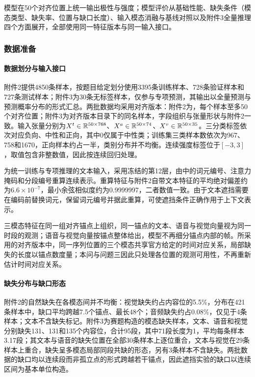 模型在50个对齐位置上统一输出极性与强度；模型评价从基础性能、缺失条件（模态类型、缺失率、位置与缺口长度）、输入模态消融与基线对照以及附件3全量推理四个方面展开，全部使用同一特征版本与同一输入接口。

\subsubsection{数据准备}
\paragraph{数据划分与输入接口}
附件2提供4850条样本，按题目给定划分使用3395条训练样本、728条验证样本和727条测试样本；附件3为30条无标签样本，仅参与专项预测，其输出以全量预测与预测概率分布的形式汇总。两批数据均采用对齐版本：附件2为，每个样本至多50个对齐位置；附件3为对齐版本目录下的同名样本，字段组织与张量形状与附件2一致。输入张量分别为$X^t\in\mathbb R^{50\times768}$、$X^a\in\mathbb R^{50\times74}$、$X^v\in\mathbb R^{50\times35}$。三分类标签依次对应负向、中性和正向，其中0仅属于中性类；训练集三类样本数依次为967、758和1670，正向样本约占一半，类别分布并不均衡。连续强度标签位于$[-3,3]$，取值包含非整数值，因此按连续回归处理。

为统一训练与专项推理的文本输入，采用冻结的第12层，由中的词元编号、注意力掩码和分段编号重算连续表示。重算特征与附件2自带文本特征的平均绝对偏差约为$6.6\times10^{-7}$，最小余弦相似度约为0.9999997，二者数值一致。由于文本遮挡需要在编码前替换词元，保留词元编号并据此重算，可使遮挡条件正确作用于上下文表示。

三模态特征在同一组对齐锚点上组织，同一锚点的文本、语音与视觉向量视为同一时段的观测；语音与视觉向量按锚点整体给出，模型不再细分锚点内部的帧。所采用的对齐版本中，同一序列位置的三个模态共享官方给定的时间对应关系，局部缺失的长度以锚点数度量；本问与问题三因此只处理各位置的观测可用性，不再重新估计时间对应关系。

\paragraph{缺失分布与缺口形态}
附件2的自然缺失在各模态间并不均衡：视觉缺失约占内容位的5.5\%，分布在421条样本中，缺口平均跨越7.5个锚点、最长48个；音频缺失约占0.08\%，仅见于4条样本；文本不含缺失标记。附件3为赛题构造的模态缺失样本，文本、语音和视觉分别缺失131、131和135个内容位，合计95段，其中71段长度为1，平均每条样本3.17段；其文本与语音的缺失位置在全部30条样本上逐位重合，文本与视觉在29条样本上重合，缺失呈多模态局部同段共缺的形态，另有3条样本不含缺失。两批数据的缺口均以连续段而非孤立点的形式跨越若干锚点，因此遮挡实验的缺口以连续区间为基本单位构造。

